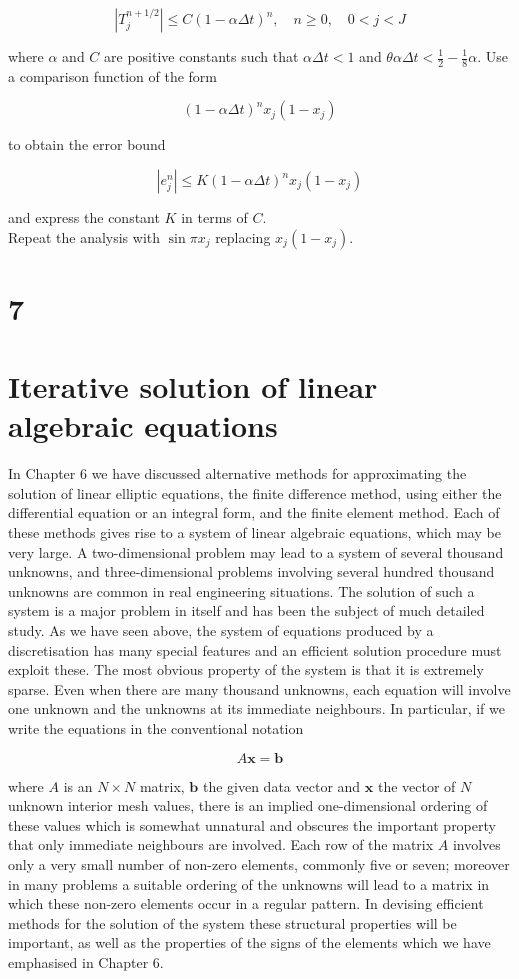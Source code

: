 \documentclass[10pt]{article}
\begin{document}
\[
\left|T_{j}^{n+1 / 2}\right| \leq C(1-\alpha \Delta t)^{n}, \quad n \geq 0, \quad 0<j<J
\]

where \(\alpha\) and \(C\) are positive constants such that \(\alpha \Delta t<1\) and \(\theta \alpha \Delta t<\frac{1}{2}-\frac{1}{8} \alpha\). Use a comparison function of the form

\[
(1-\alpha \Delta t)^{n} x_{j}\left(1-x_{j}\right)
\]

to obtain the error bound

\[
\left|e_{j}^{n}\right| \leq K(1-\alpha \Delta t)^{n} x_{j}\left(1-x_{j}\right)
\]

and express the constant \(K\) in terms of \(C\).\\
Repeat the analysis with \(\sin \pi x_{j}\) replacing \(x_{j}\left(1-x_{j}\right)\).

\section*{7}
\section*{Iterative solution of linear algebraic equations}
In Chapter 6 we have discussed alternative methods for approximating the solution of linear elliptic equations, the finite difference method, using either the differential equation or an integral form, and the finite element method. Each of these methods gives rise to a system of linear algebraic equations, which may be very large. A two-dimensional problem may lead to a system of several thousand unknowns, and three-dimensional problems involving several hundred thousand unknowns are common in real engineering situations. The solution of such a system is a major problem in itself and has been the subject of much detailed study. As we have seen above, the system of equations produced by a discretisation has many special features and an efficient solution procedure must exploit these. The most obvious property of the system is that it is extremely sparse. Even when there are many thousand unknowns, each equation will involve one unknown and the unknowns at its immediate neighbours. In particular, if we write the equations in the conventional notation

\[
A \mathbf{x}=\mathbf{b}
\]

where \(A\) is an \(N \times N\) matrix, \(\mathbf{b}\) the given data vector and \(\mathbf{x}\) the vector of \(N\) unknown interior mesh values, there is an implied one-dimensional ordering of these values which is somewhat unnatural and obscures the important property that only immediate neighbours are involved. Each row of the matrix \(A\) involves only a very small number of non-zero elements, commonly five or seven; moreover in many problems a suitable ordering of the unknowns will lead to a matrix in which these non-zero elements occur in a regular pattern. In devising efficient methods for the solution of the system these structural properties will be important, as well as the properties of the signs of the elements which we have emphasised in Chapter 6.
\end{document}
